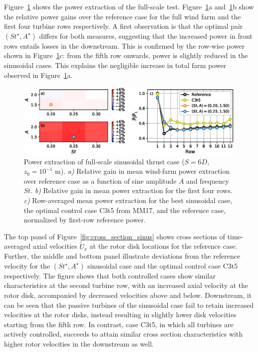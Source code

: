 \documentclass[wes, manuscript]{copernicus}
\begin{document}
Figure~\ref{fig:sinus_fullscale} shows the power extraction of the full-scale test. Figure~\ref{fig:sinus_fullscale}a and~\ref{fig:sinus_fullscale}b show the relative power gains over the reference case for the full wind farm and the first four turbine rows respectively. A first observation is that the optimal pair $(St^\star, A^\star)$ differs for both measures, suggesting that the increased power in front rows entails losses in the downstream. This is confirmed by the row-wise power shown in Figure~\ref{fig:sinus_fullscale}c: from the fifth row onwards, power is slightly reduced in the sinusoidal cases. This explains the negligible increase in total farm power observed in Figure~\ref{fig:sinus_fullscale}a. 

\begin{figure}
	\centering
	\includegraphics[width=\textwidth]{gains_fullscale.eps}
	\caption{Power extraction of full-scale sinusoidal thrust case ($S = 6D$, $z_0 = 10^{-1}$ m). \emph{a) } Relative gain in mean wind-farm power extraction over reference case as a function of sine amplitude $A$ and frequency $St$. \emph{b) } Relative gain in mean power extraction for the first four rows. \emph{c) } Row-averaged mean power extraction for the best sinusoidal case, the optimal control case C3t5 from MM17, and the reference case, normalized by first-row reference power.\label{fig:sinus_fullscale} }
\end{figure}

The top panel of Figure~\ref{fig:cross_section_sinus} shows cross sections of time-averaged axial velocities $\widetilde{U}_x$ at the rotor disk locations for the reference case. Further, the middle and bottom panel illustrate deviations from the reference velocity for the $(St^\star, A^\star)$ sinusoidal case and the optimal control case C3t5 respectively.  The figure shows that both controlled cases show similar characteristics at the second turbine row, with an increased axial velocity at the rotor disk, accompanied by decreased velocities above and below. Downstream, it can be seen that the passive turbines of the sinusoidal case fail to retain increased velocities at the rotor disks, instead resulting in slightly lower disk velocities starting from the fifth row. In contrast, case C3t5, in which all turbines are actively controlled, succeeds to attain similar cross section characteristics with higher rotor velocities in the downstream as well. 
\end{document}
